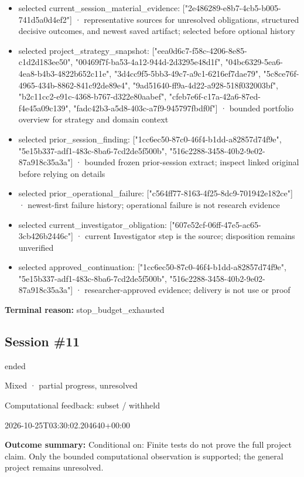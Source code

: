 \documentclass[11pt]{article}
\begin{document}
\begin{itemize}
\item selected current\_session\_material\_evidence: ["2e486289-e8b7-4cb5-b005-741d5a0d4ef2"] · representative sources for unresolved obligations, structured decisive outcomes, and newest saved artifact; selected before optional history
\item selected project\_strategy\_snapshot: ["eea0d6c7-f58c-4206-8e85-c1d2d183ee50", "00469f7f-ba53-4a12-944d-2d3295e48d1f", "04bc6329-5ea6-4ea8-b4b3-4822b652c11e", "3d4cc9f5-5bb3-49c7-a9c1-6216ef7dae79", "5c8ce76f-4965-434b-8862-841c92de89e4", "9ad51640-ff9a-4d22-a928-518f032003bf", "b2c11cc2-e91c-4368-b767-d322e80aabef", "cfeb7e6f-c17a-42a6-87ed-f4e45a09c139", "fadc42b3-a5d8-403c-a7f9-945797fbdf0f"] · bounded portfolio overview for strategy and domain context
\item selected prior\_session\_finding: ["1cc6ec50-87c0-46f4-b1dd-a82857d74f9e", "5e15b337-adf1-483c-8ba6-7cd2de5f500b", "516c2288-3458-40b2-9e02-87a918c35a3a"] · bounded frozen prior-session extract; inspect linked original before relying on details
\item selected prior\_operational\_failure: ["c564ff77-8163-4f25-8dc9-701942e182ce"] · newest-first failure history; operational failure is not research evidence
\item selected current\_investigator\_obligation: ["607e52cf-06ff-47e5-ac65-3cb426b2446c"] · current Investigator step is the source; disposition remains unverified
\item selected approved\_continuation: ["1cc6ec50-87c0-46f4-b1dd-a82857d74f9e", "5e15b337-adf1-483c-8ba6-7cd2de5f500b", "516c2288-3458-40b2-9e02-87a918c35a3a"] · researcher-approved evidence; delivery is not use or proof
\end{itemize}
\textbf{Terminal reason:} stop\_budget\_exhausted\par
\subsection{Session \#11}
\begin{description}[style=nextline,font=\normalfont\bfseries,leftmargin=0pt,labelsep=0pt]
\item[Execution status] ended
\item[Outcome] Mixed · partial progress, unresolved
\item[Strategy] Computational feedback: subset / withheld
\item[Started] 2026-10-25T03:30:02.204640+00:00
\end{description}
\textbf{Outcome summary:} Conditional on: Finite tests do not prove the full project claim. Only the bounded computational observation is supported; the general project remains unresolved.\par
\end{document}
